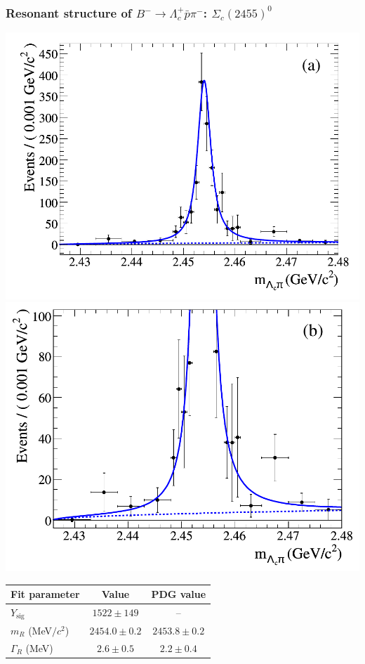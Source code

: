 \documentclass[10pt, aspectratio=169]{beamer}
\begin{document}
\begin{frame}[label=resonances-sc2455]%
  \frametitle{Resonant structure of $B^- \to \Lambda_c^+\bar{p}\pi^-$: 
              $\Sigma_c(2455)^0$}
  \centering

  \includegraphics[width=.4\textwidth]{figures/002/fit-Sc2455}
  \hspace*{2ex}
  \includegraphics[width=.4\textwidth]{figures/002/fit-Sc2455-zoom}

  \small
  \begin{tabular}{lcc}
    \hline
    Fit parameter & Value & PDG value \\
    \hline
    $Y_\mathrm{sig}$ & $1522 \pm 149$ & -- \\
    $m_R$ (MeV$/c^2$) & $2454.0 \pm 0.2$ & $2453.8 \pm 0.2$ \\
    $\Gamma_R$ (MeV) & $2.6\pm0.5$ & $2.2\pm0.4$ \\
    \hline
  \end{tabular}

\end{frame}%
\end{document}
